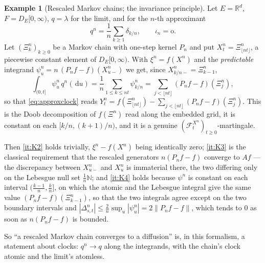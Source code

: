 \documentclass[11pt,a4paper]{article}
\theoremstyle{plain}
\theoremstyle{definition}
\newtheorem{example}[theorem]{Example}
\theoremstyle{remark}
\newcommand{\R}{\mathbb{R}}
\newcommand{\N}{\mathbb{N}}
\newcommand{\DE}{D_E[0,\infty)}
\newcommand{\Filt}{\mathcal{F}}
\newcommand{\dif}{\,\mathrm{d}}
\begin{document}
\begin{example}[Rescaled Markov chains; the invariance principle]
  \label{ex:invariance}
  Let $E = \R^d$, $F = \DE$, $q = \lambda$ for the limit, and for the $n$-th
  approximant
  \[
    q^n = \frac{1}{n} \sum_{k \geq 1} \delta_{k/n} , \qquad \iota_n = \mathrm{o} .
  \]
  Let $(\Xi^n_k)_{k \geq 0}$ be a Markov chain with one-step kernel $P_n$ and put
  $X^n_t = \Xi^n_{\lfloor nt \rfloor}$, a piecewise constant element of $\DE$.
  With $\xi^n = f(X^n)$ and the \emph{predictable} integrand
  $\psi^n_u = n\,(P_n f - f)(X^n_{u-})$ we get, since
  $X^n_{k/n-} = \Xi^n_{k-1}$,
  \[
    \int_{(0,t]} \psi^n_u \, q^n(\dif u)
      = \frac{1}{n} \sum_{1 \leq k \leq nt} \psi^n_{k/n}
      = \sum_{j < \lfloor nt \rfloor} (P_n f - f)(\Xi^n_j) ,
  \]
  so that \eqref{eq:approxclock} reads
  $Y^n_t = f(\Xi^n_{\lfloor nt\rfloor}) - \sum_{j<\lfloor nt\rfloor}(P_nf-f)(\Xi^n_j)$.
  This is the Doob decomposition of $f(\Xi^n)$ read along the embedded grid, it is
  constant on each $[k/n,(k+1)/n)$, and it is a genuine
  $(\Filt^{X^n}_t)_{t \geq 0}$-martingale.

  Then \ref{it:K2} holds trivially, $\xi^n - f(X^n)$ being identically zero;
  \ref{it:K3} is the classical requirement that the rescaled generators
  $n(P_nf - f)$ converge to $Af$ --- the discrepancy between $X^n_{u-}$ and
  $X^n_u$ is immaterial there, the two differing only on the Lebesgue null set
  $\frac1n\N$; and \ref{it:K4} holds because $\psi^n$ is constant on each interval
  $(\tfrac{k-1}{n},\tfrac{k}{n}]$, on which the atomic and the Lebesgue integral
  give the same value $(P_nf-f)(\Xi^n_{k-1})$, so that the two integrals agree
  except on the two boundary intervals and
  $|\Delta^n_{s,t}| \leq \tfrac{2}{n} \sup_u |\psi^n_u| = 2\lVert P_nf - f\rVert$,
  which tends to $0$ as soon as $n(P_nf-f)$ is bounded.

  So ``a rescaled Markov chain converges to a diffusion'' is, in this formalism,
  a statement about clocks: $q^n \to q$ along the integrands, with the chain's
  clock atomic and the limit's atomless.
\end{example}
\end{document}

